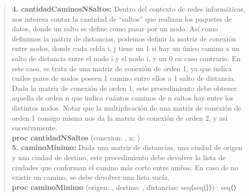 \documentclass[10pt,a4paper]{article}
\begin{document}
\begin{quote}
	\textbf{4. cantidadCaminosNSaltos:} Dentro del contexto de redes informáticas, nos interesa contar la cantidad de “saltos” que realizan los paquetes de datos, donde un salto se define como pasar por un nodo.  
	Así como definimos la matriz de distancias, podemos definir la matriz de conexión entre nodos, donde cada celda i, j tiene un 1 si hay un único camino a un salto de distancia entre el nodo i y el nodo i, y un 0 en caso contrario. En este caso, se trata de una matriz de conexión de orden 1, ya que indica cuáles pares de nodos poseen 1 camino entre ellos a 1 salto de distancia.  
	Dada la matriz de conexión de orden 1, este procedimiento debe obtener aquella de orden n que indica cuántos caminos de n saltos hay entre los distintos nodos. Notar que la multiplicación de una matriz de conexión de orden 1 consigo misma nos da la matriz de conexión de orden 2, y así sucesivamente.
	\\
	\vspace{0.2cm}
	\textbf{proc cantidadNSaltos} (\Inout conexion: \matriz{\ent}, \In n: \ent)
	\vspace{0.2cm}
	\\
	\vspace{0.2cm}
	\textbf{5. caminoMínimo:} Dada una matriz de distancias, una ciudad de origen y una ciudad de destino, este procedimiento debe devolver la lista de ciudades que conforman el camino más corto entre ambas. En caso de no existir un camino, se debe devolver una lista vacía.
	\\
	\textbf{proc caminoMinimo} (\In origen: \ent, \In destino: \ent, \In distancias: seq⟨seq⟨\ent⟩⟩) : seq⟨\ent⟩
\end{quote}
\end{document}
